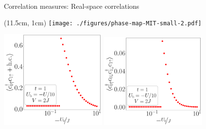 \documentclass[aspectratio=169]{beamer}
\begin{document}
\begin{frame}[noframenumbering]{Correlation measures: Real-space correlations}
\begin{textblock*}{0.3\textwidth}(11.5cm, 1cm)
	\texttt{[image: ./figures/phase-map-MIT-small-2.pdf]}
\end{textblock*}

\includegraphics[width=0.4\textwidth]{./figures/r1p-t=1.000,J=10.000,0.000,40,V=3J,Ubath=-U_by_10,N=4,U=1.000,1000.000,40.pdf}
\includegraphics[width=0.4\textwidth]{./figures/r-od-t=1.000,J=10.000,0.000,40,V=3J,Ubath=-U_by_10,N=4,U=1.000,1000.000,40.pdf}
\end{frame}
\end{document}
